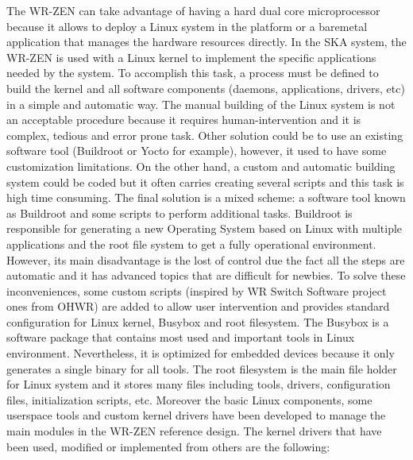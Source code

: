 \documentclass[review]{elsarticle}
\begin{document}
The WR-ZEN can take advantage of having a hard dual core microprocessor because it allows to deploy a Linux system in the platform or a baremetal application that manages the hardware resources directly. In the SKA system, the WR-ZEN is used with a Linux kernel to implement the specific applications needed by the system. To accomplish this task, a process must be defined to build the kernel and all software components (daemons, applications, drivers, etc) in a simple and automatic way. The manual building of the Linux system is not an acceptable procedure because it requires human-intervention and it is complex, tedious and error prone task. Other solution could be to use an existing software tool (Buildroot or Yocto for example), however, it used to have some customization limitations. On the other hand, a custom and automatic building system could be coded but it often carries creating several scripts and this task is high time consuming. The final solution is a mixed scheme: a software tool known as Buildroot and some scripts to perform additional tasks. Buildroot is responsible for generating a new Operating System based on Linux with multiple applications and the root file system to get a fully operational environment. However, its main disadvantage is the lost of control due the fact all the steps are automatic and it has advanced topics that are difficult for newbies. To solve these inconveniences, some custom scripts (inspired by WR Switch Software project ones from OHWR) are added to allow user intervention and provides standard configuration for Linux kernel, Busybox and root filesystem. The Busybox is a software package that contains most used and important tools in Linux environment. Nevertheless, it is optimized for embedded devices because it only generates a single binary for all tools. The root filesystem is the main file holder for Linux system and it stores many files including tools, drivers, configuration files, initialization scripts, etc. Moreover the basic Linux components, some userspace tools and custom kernel drivers have been developed to manage the main modules in the WR-ZEN reference design. The kernel drivers that have been used, modified or implemented from others are the following:

\end{document}
